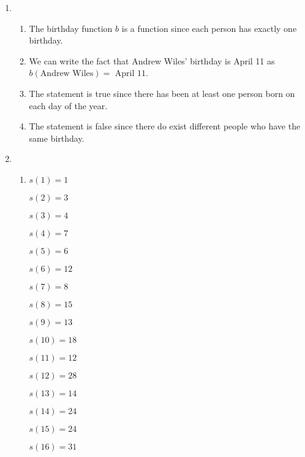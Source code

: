 \begin{enumerate}
\item \begin{enumerate}
\item The birthday function  $b$  is  a function since each person has exactly one birthday.

\item We can write the fact that Andrew Wiles'  birthday is April 11 as 
$b( {\text{Andrew Wiles}} ) = \text{ April 11}$.

\item The statement is true since there has been at least one person born on each day of the year.

\item The statement is false since there do exist different people who have the same birthday.
\end{enumerate}


\item \begin{enumerate}

\item \begin{multicols}{4}
$s( 1 ) = 1$	

$s( 2 ) = 3$	

$s( 3 ) = 4$	

$s( 4 ) = 7$

$s( 5 ) = 6$	

$s( 6 ) = 12$	

$s( 7 ) = 8$	

$s( 8 ) = 15$

$s( 9 ) = 13$	

$s( {10} ) = 18$	

$s( {11} ) = 12$	

$s( {12} ) = 28$

$s( {13} ) = 14$	

$s( {14} ) = 24$	

$s( 15 ) = 24$	

$s( {16} ) = 31$
\end{multicols}



\end{enumerate}
\end{enumerate}
